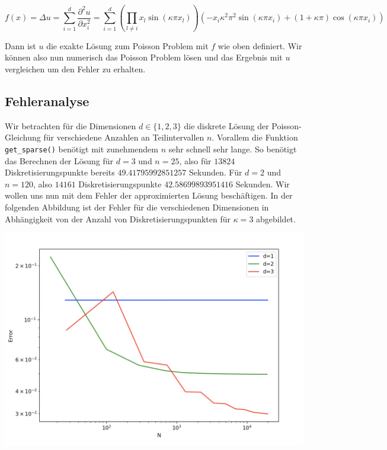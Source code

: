 \documentclass[smallheadings]{scrartcl}
\theoremstyle{definition}
\begin{document}
$$f(x)=\Delta u= \sum_{i=1}^d\frac{\partial ^2 u}{\partial x_i^2}=
 \sum_{i=1}^d \left(\prod_{l\neq i}x_l\sin (\kappa\pi x_l)\right)\left(-x_i\kappa ^2\pi ^2\sin (\kappa\pi x_i)+(1+\kappa\pi)\cos (\kappa\pi x_i) \right)$$

Dann ist $u$ die exakte Lösung zum Poisson Problem mit $f$ wie oben definiert. Wir können also nun numerisch das Poisson Problem lösen und das Ergebnis mit $u$ vergleichen um den Fehler zu erhalten. 

\subsection{Fehleranalyse}

Wir betrachten für die Dimensionen $d\in\{1,2,3\}$ die diskrete Lösung der Poisson-Gleichung für verschiedene Anzahlen an Teilintervallen $n$. Vorallem die Funktion \texttt{get\_sparse()} benötigt mit zunehmendem $n$ sehr schnell sehr lange. So benötigt das Berechnen der Lösung für $d=3$ und $n=25$, also für $13824$ Diskretisierungspunkte bereits $49.41795992851257$ Sekunden. Für $d=2$ und $n=120$, also $14161$ Diskretisierungspunkte $42.58699893951416$ Sekunden. 
Wir wollen uns nun mit dem Fehler der approximierten Lösung beschäftigen. In der folgenden Abbildung ist der Fehler für die verschiedenen Dimensionen in Abhängigkeit von der Anzahl von Diskretisierungspunkten für $\kappa =3$ abgebildet.



\begin{minipage}{\textwidth}

 \centering
 \includegraphics[scale = 0.4]{error}
 	\label{error}

 \end{minipage}
\end{document}
